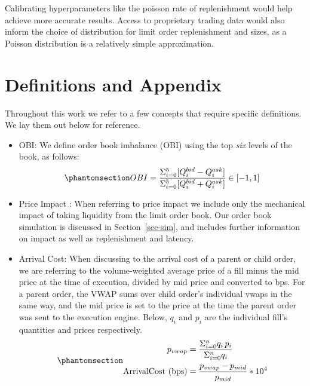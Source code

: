 \documentclass[
  letterpaper,
]{article}
\begin{document}
Calibrating hyperparameters like the poisson rate of replenishment would
help achieve more accurate results. Access to proprietary trading data
would also inform the choice of distribution for limit order
replenishment and sizes, as a Poisson distribution is a relatively
simple approximation.

\newpage{}

\section{Definitions and Appendix}\label{sec-definitions}

Throughout this work we refer to a few concepts that require specific
definitions. We lay them out below for reference.

\begin{itemize}
\item
  OBI: We define order book imbalance (OBI) using the top \emph{six}
  levels of the book, as follows:
  \begin{equation}\phantomsection\label{eq-obi}{
  \begin{split}
  OBI = \frac{\Sigma_{i=0}^5 [Q_{i}^{bid} - Q_{i}^{ask}]}{\Sigma_{i=0}^5 [Q_{i}^{bid} + Q_{i}^{ask}]}\in [-1, 1]
  \end{split}
  }\end{equation}
\item
  Price Impact : When referring to price impact we include only the
  mechanical impact of taking liquidity from the limit order book. Our
  order book simulation is discussed in Section~\ref{sec-sim}, and
  includes further information on impact as well as replenishment and
  latency.
\item
  Arrival Cost: When discussing to the arrival cost of a parent or child
  order, we are referring to the volume-weighted average price of a fill
  minus the mid price at the time of execution, divided by mid price and
  converted to bps. For a parent order, the VWAP sums over child order's
  individual vwaps in the same way, and the mid price is set to the
  price at the time the parent order was sent to the execution engine.
  Below, \(q_i\) and \(p_i\) are the individual fill's quantities and
  prices respectively. \begin{equation}\phantomsection\label{eq-vwap}{
  \begin{split}
  p_{vwap} &= \frac{\Sigma_{i=0}^nq_i\,p_i}{\Sigma_{i=0}^nq_i}\\ 
  \text{ArrivalCost (bps)} &= \frac{p_{vwap} - p_{mid}}{p_{mid}} * 10^4
  \end{split}
  }\end{equation}
\end{itemize}
\end{document}
